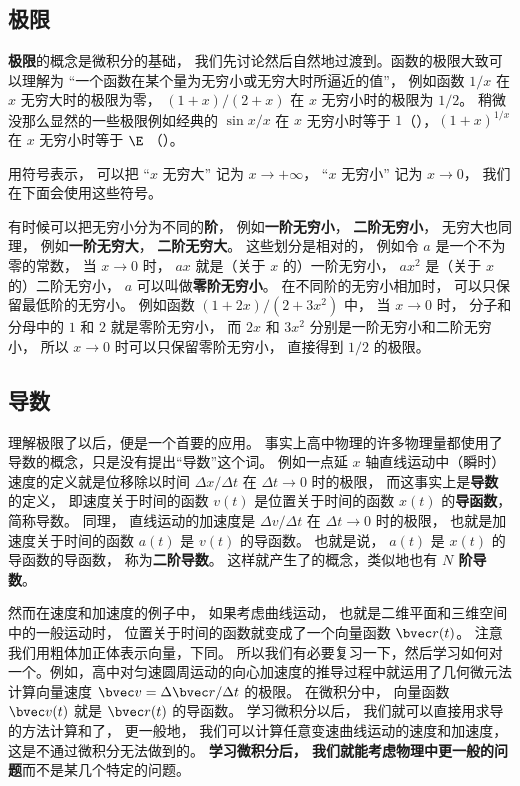 \subsection{极限}
\textbf{极限}的概念是微积分的基础， 我们先讨论然后自然地过渡到。函数的极限大致可以理解为 “一个函数在某个量为无穷小或无穷大时所逼近的值”， 例如函数 $1/x$ 在 $x$ 无穷大时的极限为零， $(1+x)/(2+x)$ 在 $x$ 无穷小时的极限为 $1/2$。 稍微没那么显然的一些极限例如经典的 $\sin x/ x$ 在 $x$ 无穷小时等于 $1$（），$(1+x)^{1/x}$ 在 $x$ 无穷小时等于 $\E$ （）。

用符号表示， 可以把 “$x$ 无穷大” 记为 $x \to +\infty$， “$x$ 无穷小” 记为 $x \to 0$， 我们在下面会使用这些符号。

有时候可以把无穷小分为不同的\textbf{阶}， 例如\textbf{一阶无穷小}， \textbf{二阶无穷小}， 无穷大也同理， 例如\textbf{一阶无穷大}， \textbf{二阶无穷大}。 这些划分是相对的， 例如令 $a$ 是一个不为零的常数， 当 $x \to 0$ 时， $a x$ 就是（关于 $x$ 的）一阶无穷小， $a x^2$ 是（关于 $x$ 的）二阶无穷小， $a$ 可以叫做\textbf{零阶无穷小}。 在不同阶的无穷小相加时， 可以只保留最低阶的无穷小。 例如函数 $(1+2x)/(2+3x^2)$ 中， 当 $x\to 0$ 时， 分子和分母中的 $1$ 和 $2$ 就是零阶无穷小， 而 $2x$ 和 $3x^2$ 分别是一阶无穷小和二阶无穷小， 所以 $x\to 0$ 时可以只保留零阶无穷小， 直接得到 $1/2$ 的极限。

\subsection{导数}
理解极限了以后，便是一个首要的应用。 事实上高中物理的许多物理量都使用了导数的概念，只是没有提出“导数”这个词。 例如一点延 $x$ 轴直线运动中（瞬时）速度的定义就是位移除以时间 $\Delta x/\Delta t$ 在 $\Delta t \to 0$ 时的极限， 而这事实上是\textbf{导数}的定义， 即速度关于时间的函数 $v(t)$ 是位置关于时间的函数 $x(t)$ 的\textbf{导函数}， 简称导数。 同理， 直线运动的加速度是 $\Delta v/\Delta t$ 在 $\Delta t \to 0$ 时的极限， 也就是加速度关于时间的函数 $a(t)$ 是 $v(t)$ 的导函数。 也就是说， $a(t)$ 是 $x(t)$ 的导函数的导函数， 称为\textbf{二阶导数}。 这样就产生了的概念，类似地也有 \textbf{$N$ 阶导数}。

然而在速度和加速度的例子中， 如果考虑曲线运动， 也就是二维平面和三维空间中的一般运动时， 位置关于时间的函数就变成了一个向量函数 $\bvec r(t)$。 注意我们用粗体加正体表示向量，下同。 所以我们有必要复习一下，然后学习如何对一个。例如，高中对匀速圆周运动的向心加速度的推导过程中就运用了几何微元法计算向量速度 $\bvec v = \Delta \bvec r/\Delta t$ 的极限。 在微积分中， 向量函数 $\bvec v(t)$ 就是 $\bvec r(t)$ 的导函数。 学习微积分以后， 我们就可以直接用求导的方法计算和了， 更一般地， 我们可以计算任意变速曲线运动的速度和加速度， 这是不通过微积分无法做到的。 \textbf{学习微积分后， 我们就能考虑物理中更一般的问题}而不是某几个特定的问题。

